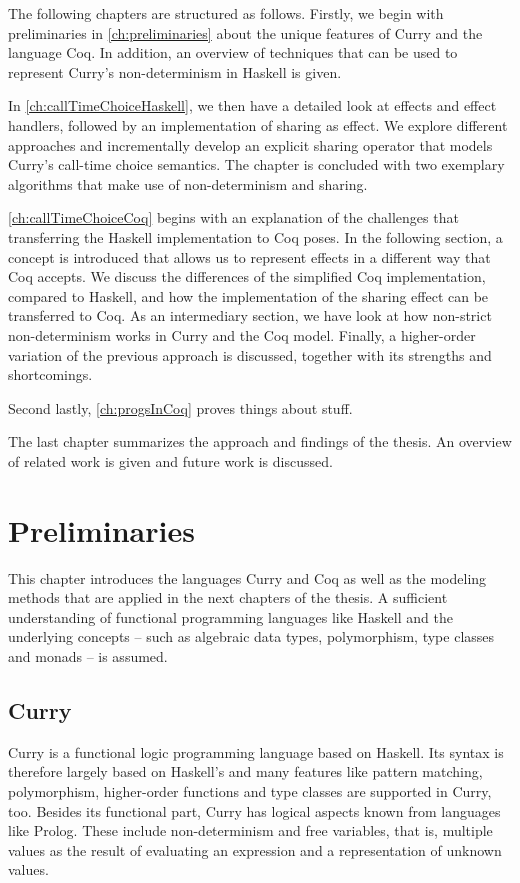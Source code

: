 \documentclass[a4paper, 11pt, fleqn, twoside]{scrreprt}
\newcommand{\todo}[1]{\marginpar{\textbf{TODO:} #1}}
\begin{document}
The following chapters are structured as follows.
Firstly, we begin with preliminaries in \autoref{ch:preliminaries} about the unique features of Curry and the language Coq.
In addition, an overview of techniques that can be used to represent Curry's non-determinism in Haskell is given.

In \autoref{ch:callTimeChoiceHaskell}, we then have a detailed look at effects and effect handlers, followed by an implementation of sharing as effect.
We explore different approaches and incrementally develop an explicit sharing operator that models Curry's call-time choice semantics.
The chapter is concluded with two exemplary algorithms that make use of non-determinism and sharing.

\autoref{ch:callTimeChoiceCoq} begins with an explanation of the challenges that transferring the Haskell implementation to Coq poses.
In the following section, a concept is introduced that allows us to represent effects in a different way that Coq accepts.
We discuss the differences of the simplified Coq implementation, compared to Haskell, and how the implementation of the sharing effect can be transferred to Coq.
As an intermediary section, we have look at how non-strict non-determinism works in Curry and the Coq model.
Finally, a higher-order variation of the previous approach is discussed, together with its strengths and shortcomings.

Second lastly, \autoref{ch:progsInCoq} proves things about stuff. \todo{Write chapter 5}

The last chapter summarizes the approach and findings of the thesis.
An overview of related work is given and future work is discussed.


\chapter{Preliminaries}
\label{ch:preliminaries}
This chapter introduces the languages Curry and Coq as well as the modeling methods that are applied in the next chapters of the thesis.
A sufficient understanding of functional programming languages like Haskell and the underlying concepts -- such as algebraic data types, polymorphism, type classes and monads -- is assumed.


\section{Curry}
Curry \citep{hanus2016curry} is a functional logic programming language based on Haskell.
Its syntax is therefore largely based on Haskell's and many features like pattern matching, polymorphism, higher-order functions and type classes are supported in Curry, too.
Besides its functional part, Curry has logical aspects known from languages like Prolog.
These include non-determinism and free variables, that is,  multiple values as the result of evaluating an expression and a representation of unknown values.
\end{document}
